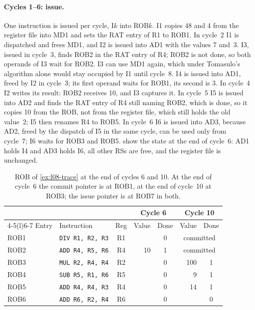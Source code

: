 \documentclass[../main.tex]{subfiles}
\begin{document}
\paragraph{Cycles 1--6: issue.}
One instruction is issued per cycle, I$k$ into ROB$k$.  I1 copies 48 and 4
from the register file into MD1 and sets the RAT entry of R1 to ROB1.  In
cycle~2 I1 is dispatched and frees MD1, and I2 is issued into AD1 with the
values 7 and~3.  I3, issued in cycle~3, finds ROB2 in the RAT entry of R4; ROB2
is not done, so both operands of I3 wait for ROB2.  I3 can use MD1 again,
which under Tomasulo's algorithm alone would stay occupied by I1 until
cycle~8.  I4 is issued into AD1, freed by I2 in cycle~3; its first operand
waits for ROB1, its second is 3.  In cycle~4 I2 writes its result: ROB2
receives 10, and I3 captures it.  In cycle~5 I5 is issued into AD2 and finds
the RAT entry of R4 still naming ROB2, which is done, so it copies 10 from the
ROB, not from the register file, which still holds the old value~2; I5 then
renames R4 to ROB5.  In
cycle~6 I6 is issued into AD3, because AD2, freed by the dispatch of I5 in the
same cycle, can be used only from cycle~7; I6 waits for ROB3 and ROB5.
 show the state at the end of
cycle~6: AD1 holds I4 and AD3 holds I6, all other RSs are free, and the
register file is unchanged.

\begin{table}[htbp]
  \centering\small
  \caption{ROB of \cref{ex:l08-trace} at the end of cycles 6 and 10.  At the
    end of cycle~6 the commit pointer is at ROB1, at the end of cycle~10 at
    ROB3; the issue pointer is at ROB7 in both.}
  \label{tab:l08-rob-state}
  \begin{tabular}{@{}llcrcrc@{}}
    \toprule
    & & & \multicolumn{2}{c}{Cycle 6} & \multicolumn{2}{c}{Cycle 10} \\
    \cmidrule(lr){4-5}\cmidrule(l){6-7}
    Entry & Instruction & Reg & Value & Done & Value & Done \\
    \midrule
    ROB1 & \texttt{DIV R1, R2, R3} & R1 &     & 0 & \multicolumn{2}{c}{committed} \\
    ROB2 & \texttt{ADD R4, R5, R6} & R4 & 10  & 1 & \multicolumn{2}{c}{committed} \\
    ROB3 & \texttt{MUL R2, R4, R4} & R2 &     & 0 & 100 & 1 \\
    ROB4 & \texttt{SUB R5, R1, R6} & R5 &     & 0 & 9   & 1 \\
    ROB5 & \texttt{ADD R4, R4, R3} & R4 &     & 0 & 14  & 1 \\
    ROB6 & \texttt{ADD R6, R2, R4} & R6 &     & 0 &     & 0 \\
    \bottomrule
  \end{tabular}
\end{table}
\end{document}
